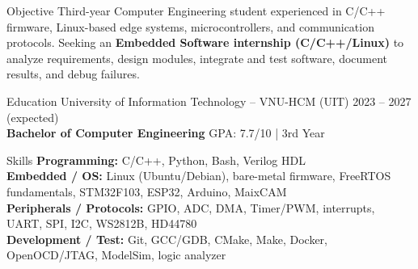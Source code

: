 \documentclass{resume}
\begin{document}
\begin{rSection}{Objective}
\vspace{-3pt}
{Third-year Computer Engineering student experienced in C/C++ firmware, Linux-based edge systems, microcontrollers, and communication protocols. Seeking an \textbf{Embedded Software internship (C/C++/Linux)} to analyze requirements, design modules, integrate and test software, document results, and debug failures.}
\end{rSection}

\begin{rSection}{Education}
\vspace{-3pt}
University of Information Technology -- VNU-HCM (UIT) \hfill 2023 -- 2027 (expected)\\
{\bf Bachelor of Computer Engineering} \hfill GPA: 7.7/10 | 3rd Year
\end{rSection}

\begin{rSection}{Skills}
\vspace{-3pt}
{\bf Programming:} C/C++, Python, Bash, Verilog HDL\\
{\bf Embedded / OS:} Linux (Ubuntu/Debian), bare-metal firmware, FreeRTOS fundamentals, STM32F103, ESP32, Arduino, MaixCAM\\
{\bf Peripherals / Protocols:} GPIO, ADC, DMA, Timer/PWM, interrupts, UART, SPI, I2C, WS2812B, HD44780\\
{\bf Development / Test:} Git, GCC/GDB, CMake, Make, Docker, OpenOCD/JTAG, ModelSim, logic analyzer
\end{rSection}
\end{document}
